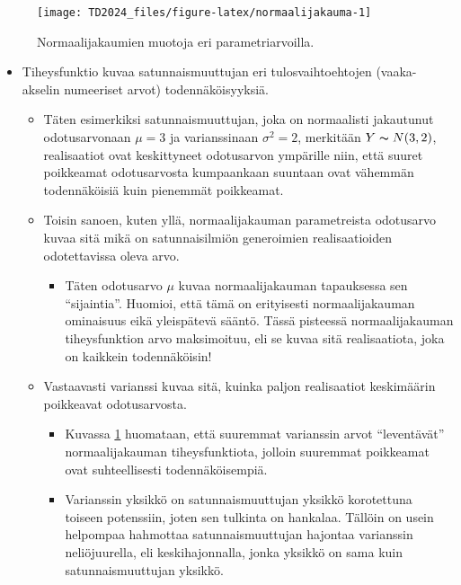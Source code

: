 \documentclass[
]{book}
\providecommand{\tightlist}{%
  \setlength{\itemsep}{0pt}\setlength{\parskip}{0pt}}
\begin{document}
\begin{figure}

{\centering \texttt{[image: TD2024\_files/figure-latex/normaalijakauma-1]} 

}

\caption{Normaalijakaumien muotoja eri parametriarvoilla.}\label{fig:normaalijakauma}
\end{figure}

\begin{itemize}
\tightlist
\item
  Tiheysfunktio kuvaa satunnaismuuttujan eri tulosvaihtoehtojen (vaaka-akselin numeeriset arvot) todennäköisyyksiä.

  \begin{itemize}
  \tightlist
  \item
    Täten esimerkiksi satunnaismuuttujan, joka on normaalisti jakautunut odotusarvonaan \(\mu = 3\) ja varianssinaan \(\sigma^2 = 2\), merkitään \(Y \thicksim N(3,2)\), realisaatiot ovat keskittyneet odotusarvon ympärille niin, että suuret poikkeamat odotusarvosta kumpaankaan suuntaan ovat vähemmän todennäköisiä kuin pienemmät poikkeamat.
  \item
    Toisin sanoen, kuten yllä, normaalijakauman parametreista odotusarvo kuvaa sitä mikä on satunnaisilmiön generoimien realisaatioiden odotettavissa oleva arvo.

    \begin{itemize}
    \tightlist
    \item
      Täten odotusarvo \(\mu\) kuvaa normaalijakauman tapauksessa sen ``sijaintia''. Huomioi, että tämä on erityisesti normaalijakauman ominaisuus eikä yleispätevä sääntö. Tässä pisteessä normaalijakauman tiheysfunktion arvo maksimoituu, eli se kuvaa sitä realisaatiota, joka on kaikkein todennäköisin!
    \end{itemize}
  \item
    Vastaavasti varianssi kuvaa sitä, kuinka paljon realisaatiot keskimäärin poikkeavat odotusarvosta.

    \begin{itemize}
    \tightlist
    \item
      Kuvassa \ref{fig:normaalijakauma} huomataan, että suuremmat varianssin arvot ``leventävät'' normaalijakauman tiheysfunktiota, jolloin suuremmat poikkeamat ovat suhteellisesti todennäköisempiä.
    \item
      Varianssin yksikkö on satunnaismuuttujan yksikkö korotettuna toiseen potenssiin, joten sen tulkinta on hankalaa. Tällöin on usein helpompaa hahmottaa satunnaismuuttujan hajontaa varianssin neliöjuurella, eli keskihajonnalla, jonka yksikkö on sama kuin satunnaismuuttujan yksikkö.
    \end{itemize}
  \end{itemize}
\end{itemize}
\end{document}
